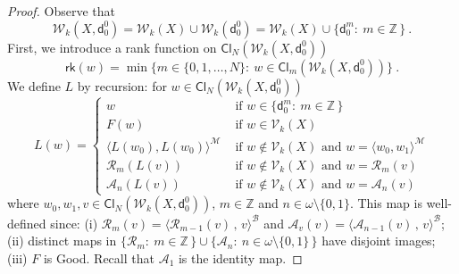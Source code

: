 \documentclass[10pt,a4paper, openany,  oldfontcommands]{memoir}
\newtheorem{open problem} [theorem] {Open Problem}
\newtheorem{open question} [theorem] {Open Question}
\begin{document}
\begin{proof}


Observe that 
\[
\mathcal{W}_{k}  \left( X  ,  \mathsf{d}^0_0 \right)    
= 
  \mathcal{W}_{k}  \left( X   \right)    \cup     \mathcal{W}_{k}  \left(  \mathsf{d}^0_0   \right)  
= 
  \mathcal{W}_{k}  \left( X   \right)  
\cup   \big\{   \mathsf{d}^m_0  :   \    m  \in  \mathbb{Z}   \,   \big\}
\        .
\]
First,  we  introduce a rank function on   $ \mathsf{Cl}_{N}  \left(  \mathcal{W}_{k}  \left( X ,  \mathsf{d}^0_0   \right)   \right)    $
\[
\mathsf{rk}  \left(  w  \right)   =  \min  
\big\{  m  \in  \lbrace 0, 1,  \ldots ,  N  \rbrace  :   \  
 w  \in  \mathsf{Cl}_{m}  \left(  \mathcal{W}_{k}  \left( X ,   \mathsf{d}^0_0    \right)   \right)     \big\}  
\     .
\]
We define  $L$ by recursion:   for  $  w  \in      \mathsf{Cl}_{N}  \left(  \mathcal{W}_{k}  \left( X  ,   \mathsf{d}^0_0    \right)   \right)     $
\[
L  \left(  w  \right)   =   \begin{cases}
w            &   \mbox{  if   }     w  \in    \big\{   \mathsf{d}^m_0  :   \    m  \in  \mathbb{Z}   \,   \big\} 
\\
F ( w)      &     \mbox{  if   }   w  \in    \mathcal{V}_{ k  }  \left(  X  \right) 
\\
\langle  L(w_0),   L(w_0 )   \rangle^{   \mathcal{M}  }      &    \mbox{  if  }  w  \not\in   \mathcal{V}_{ k  }  \left(  X  \right)   
                     \mbox{  and   }    w  =  \langle  w_0,  w_1    \rangle^{   \mathcal{M}  }  
\\
\mathcal{R}_m  \left(   L(v)  \right)      &    \mbox{  if  }  w  \not\in   \mathcal{V}_{ k  }  \left(  X  \right)   
                     \mbox{  and   }      w  =       \mathcal{R}_m  \left(   v \right)    
\\
\mathcal{A}_n  \left(   L(v)  \right)      &    \mbox{  if  }  w  \not\in   \mathcal{V}_{ k  }  \left(  X  \right)   
                     \mbox{  and   }      w  =       \mathcal{A}_n  \left(   v \right)                                   
\end{cases}
\]
where   $   w_0,  w_1,  v   \in   \mathsf{Cl}_{N}  \left(  \mathcal{W}_{k}  \left( X   ,  \mathsf{d}^0_0   \right)   \right)     $, 
$  m  \in  \mathbb{Z}  $  and  $  n \in  \omega  \setminus  \lbrace 0, 1  \rbrace  $. 
This map is well-defined since: 
(i)   $   \mathcal{R}_m  \left(   v \right)    =  \langle    \mathcal{R}_{m-1}  \left(   v \right)     \,  ,   \,  v  \rangle^{  \mathcal{B} }  $  
and  
 $   \mathcal{A}_v  \left(   v \right)    =  \langle    \mathcal{A}_{n-1}  \left(   v \right)     \,  ,   \,  v  \rangle^{  \mathcal{B} }  $; 
 (ii) distinct maps in    $   \lbrace  \mathcal{R}_m   :  \   m  \in  \mathbb{Z} \,   \rbrace   \cup 
 \lbrace  \mathcal{A}_n :  \   n  \in    \omega  \setminus \lbrace 0, 1   \rbrace  \,   \rbrace       $
 have disjoint images; 
 (iii)  $F$ is  \textsf{Good}.
Recall that    $  \mathcal{A}_1  $  is  the identity map. 











\end{proof}
\end{document}
